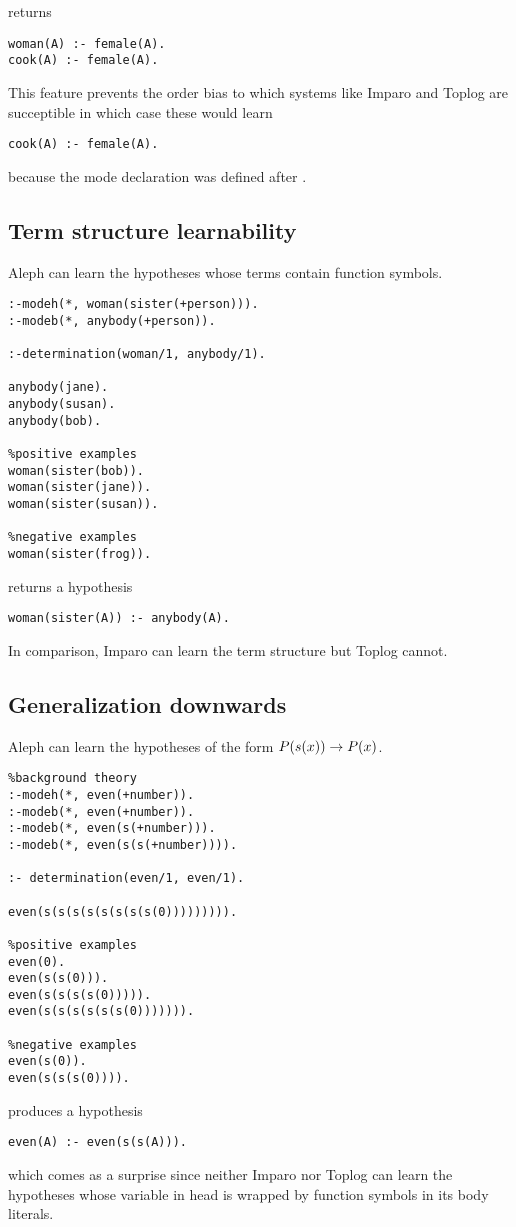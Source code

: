 returns
\begin{lstlisting}
woman(A) :- female(A).
cook(A) :- female(A).
\end{lstlisting}
This feature prevents the order bias to which systems like Imparo and Toplog are succeptible in which case these would learn
\begin{lstlisting}
cook(A) :- female(A).
\end{lstlisting} because the mode declaration
 was defined after .

\subsection{Term structure learnability}
Aleph can learn the hypotheses whose terms contain function symbols.
\begin{lstlisting}
:-modeh(*, woman(sister(+person))).
:-modeb(*, anybody(+person)).

:-determination(woman/1, anybody/1).

anybody(jane).
anybody(susan).
anybody(bob).

%positive examples
woman(sister(bob)).
woman(sister(jane)).
woman(sister(susan)).

%negative examples
woman(sister(frog)).
\end{lstlisting}
returns a hypothesis
\begin{lstlisting}
woman(sister(A)) :- anybody(A).
\end{lstlisting}
In comparison, Imparo can learn the term structure but Toplog cannot.

\subsection{Generalization downwards}
Aleph can learn the hypotheses of the form $P(s(x)) \to P(x)$.

\begin{lstlisting}
%background theory
:-modeh(*, even(+number)).
:-modeb(*, even(+number)).
:-modeb(*, even(s(+number))).
:-modeb(*, even(s(s(+number)))).

:- determination(even/1, even/1).

even(s(s(s(s(s(s(s(s(0))))))))).

%positive examples
even(0).
even(s(s(0))).
even(s(s(s(s(0))))).
even(s(s(s(s(s(s(0))))))).

%negative examples
even(s(0)).
even(s(s(s(0)))).
\end{lstlisting}
produces a hypothesis
\begin{lstlisting}
even(A) :- even(s(s(A))).
\end{lstlisting}
which comes as a surprise since neither Imparo nor Toplog can learn the hypotheses whose variable in head is wrapped by function symbols in its body literals.


